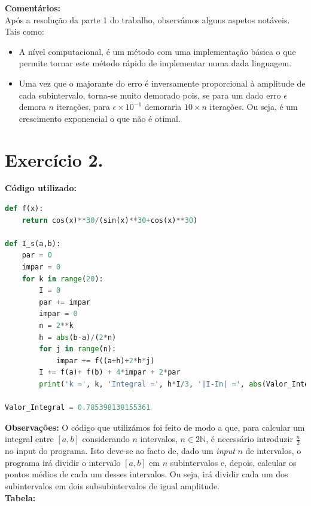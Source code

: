 \documentclass{article}
\begin{document}
\textbf{Comentários:}\\
Após a resolução da parte 1 do trabalho, observámos alguns aspetos notáveis. Tais como:
\begin{itemize}
  \item{A nível computacional, é um método com uma implementação básica o que permite tornar este método rápido de implementar numa dada linguagem.}
  \item{Uma vez que o majorante do erro é inversamente proporcional à amplitude de cada subintervalo, torna-se muito demorado pois, se para um dado erro $\epsilon$ demora $n$ iterações, para $\epsilon\times10^{-1}$ demoraria $10\times n$ iterações. Ou seja, é um crescimento exponencial o que não é otimal.}
\end{itemize}

\section*{Exercício 2.}
\textbf{Código utilizado:}
\begin{lstlisting}[language=Python]
def f(x):
    return cos(x)**30/(sin(x)**30+cos(x)**30)

def I_s(a,b):
    par = 0
    impar = 0
    for k in range(20):
        I = 0
        par += impar
        impar = 0
        n = 2**k
        h = abs(b-a)/(2*n)
        for j in range(n):
            impar += f((a+h)+2*h*j)
        I += f(a)+ f(b) + 4*impar + 2*par
        print('k =', k, 'Integral =', h*I/3, '|I-In| =', abs(Valor_Integral-h*I/3))

Valor_Integral = 0.785398138155361
\end{lstlisting}
\textbf{Observações:} O código que utilizámos foi feito de modo a que, para calcular um integral entre $[a,b]$ considerando $n$ intervalos, $n\in2\mathbb{N}$, é necessário introduzir $\frac{n}{2}$ no input do programa. Isto deve-se ao facto de, dado um \textit{input} $n$ de intervalos, o programa irá dividir o intervalo $[a,b]$ em $n$ subintervalos e, depois, calcular os pontos médios de cada um desses intervalos. Ou seja, irá dividir cada um dos subintervalos em dois subsubintervalos de igual amplitude.\\[5mm]
\textbf{Tabela:}
\end{document}
